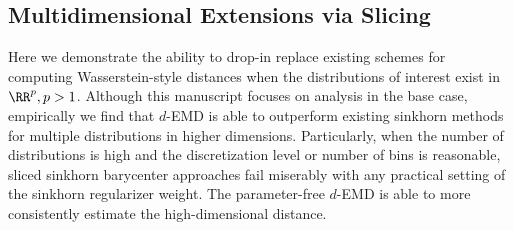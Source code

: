 \subsection{Multidimensional Extensions via Slicing}

Here we demonstrate the ability to drop-in replace existing schemes for computing Wasserstein-style distances when the distributions of interest exist in $\RR^p, p > 1$. Although this manuscript focuses on analysis in the base case, empirically we find that $d$-EMD is able to outperform existing sinkhorn methods for multiple distributions in higher dimensions. Particularly, when the number of distributions is high and the discretization level or number of bins is reasonable, sliced sinkhorn barycenter approaches fail miserably with any practical setting of the sinkhorn regularizer weight. The parameter-free $d$-EMD is able to more consistently estimate the high-dimensional distance.